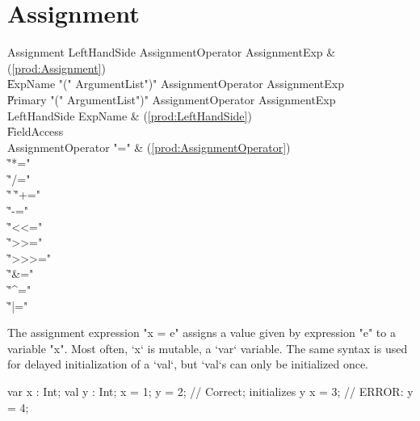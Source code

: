 \section{Assignment}\label{AssignmentStatement}

\begin{bbgrammar}
          Assignment \: LeftHandSide AssignmentOperator AssignmentExp & (\ref{prod:Assignment}) \\
                    \| ExpName  \xcd"(" ArgumentList\opt \xcd")" AssignmentOperator AssignmentExp \\
                    \| Primary  \xcd"(" ArgumentList\opt \xcd")" AssignmentOperator AssignmentExp \\
        LeftHandSide \: ExpName & (\ref{prod:LeftHandSide}) \\
                    \| FieldAccess \\
  AssignmentOperator \: \xcd"=" & (\ref{prod:AssignmentOperator}) \\
                    \| \xcd"*=" \\
                    \| \xcd"/=" \\
                    \| \xcd"%
                    \| \xcd"+=" \\
                    \| \xcd"-=" \\
                    \| \xcd"<<=" \\
                    \| \xcd">>=" \\
                    \| \xcd">>>=" \\
                    \| \xcd"&=" \\
                    \| \xcd"^=" \\
                    \| \xcd"|=" \\
\end{bbgrammar}



The assignment expression \xcd"x = e" assigns a value given by
expression \xcd"e"
to a variable \xcd"x".  
Most often, \xcd`x` is mutable, a \xcd`var` variable.  The same syntax is
used for delayed initialization of a \xcd`val`, but \xcd`val`s can only be
initialized once.
\begin{xten}
  var x : Int;
  val y : Int;
  x = 1;
  y = 2; // Correct; initializes y
  x = 3; 
  // ERROR: y = 4;
\end{xten}



